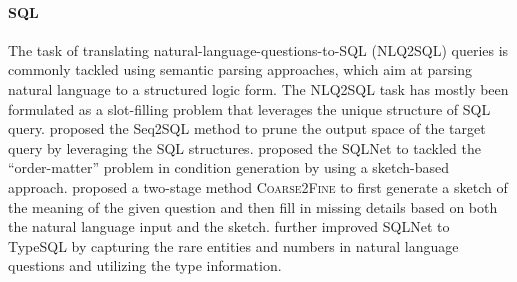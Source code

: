\paragraph{SQL}

The task of translating natural-language-questions-to-SQL (NLQ2SQL) queries is commonly tackled using semantic parsing approaches, which aim at parsing natural language to a structured logic form. 
The NLQ2SQL task has mostly been formulated as a slot-filling problem that leverages the unique structure of SQL query. 
\citet{zhong2017seq2sql} proposed the Seq2SQL method to prune the output space of the target query by leveraging the SQL structures. 
\citet{xu2017sqlnet} proposed the SQLNet to tackled the ``order-matter'' problem in condition generation by using a sketch-based approach.
\citet{dong2018coarse}proposed a two-stage method \textsc{Coarse2Fine} to first generate a sketch of the meaning of the given question and then fill in missing details based on both the natural language input and the sketch.
\citet{yu2018typesql} further improved SQLNet to TypeSQL by capturing the rare entities and numbers in natural language questions and utilizing the type information. 

